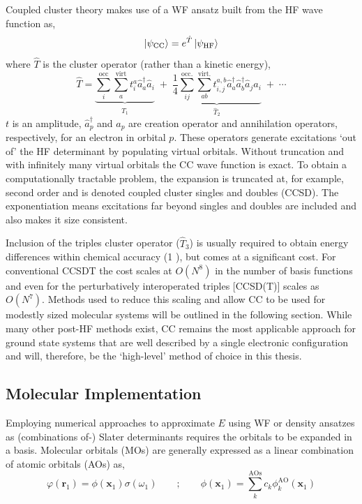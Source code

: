 \documentclass[main.tex]{subfiles}
\begin{document}
Coupled cluster theory makes use of a WF ansatz built from the HF wave function as,
\begin{equation}
\ket{\psi_\text{CC}} = {e}^{\hat{T}}\ket{\psi_\text{HF}}
\end{equation}
where $\hat{T}$ is the cluster operator (rather than a kinetic energy),
\begin{equation}
\hat{T} = \underbrace{\sum_i^\text{occ}\sum_a^\text{virt} t_i^a \hat{a}^\dagger_a\hat{a}_i }_{\hat{T}_1} \;+\; \underbrace{\frac{1}{4}\sum_{ij}^\text{occ.}\sum_{ab}^\text{virt.}t_{i, j}^{a, b} \hat{a}_a^\dagger\hat{a}_b^\dagger \hat{a}_j \hat{a}_i}_{\hat{T}_2} \;+ \;\cdots
\end{equation}
$t$ is an amplitude, $\hat{a}^\dagger_p$ and $\hat{a}_p$ are creation operator and annihilation operators, respectively, for an electron in orbital $p$. These operators  generate excitations `out of' the HF determinant by populating virtual orbitals. Without truncation and with infinitely many virtual orbitals the CC wave function is exact. To obtain a computationally tractable problem, the expansion is truncated at, for example, second order and is denoted coupled cluster singles and doubles (CCSD). The exponentiation means excitations far beyond singles and doubles are included and also makes it size consistent. 


Inclusion of the triples cluster operator ($\hat{T}_3$) is usually required to obtain energy differences within chemical accuracy (1 \kcal),\cite{Deustua2021} but comes at a significant cost. For conventional CCSDT the cost scales at $O(N^8)$ in the number of basis functions and even for the perturbatively interoperated triples [CCSD(T)] scales as $O(N^7)$. Methods used to reduce this scaling and allow CC to be used for modestly sized molecular systems will be outlined in the following section. While many other post-HF methods exist,\cite{SzaboOstlund} CC remains the most applicable approach for ground state systems that are well described by a single electronic configuration and will, therefore, be the `high-level' method of choice in this thesis.  


\subsection{Molecular Implementation}

Employing numerical approaches to approximate $E$ using WF or density ansatzes as (combinations of-) Slater determinants requires the orbitals to be expanded in a basis. Molecular orbitals (MOs) are generally expressed as a linear combination of atomic orbitals (AOs) as,
\begin{equation}
	\varphi(\boldsymbol{r}_1) = \phi(\boldsymbol{x}_1)\sigma(\omega_1) \qquad ; \qquad \phi(\boldsymbol{x}_1) = \sum_{k}^\text{AOs} c_k\phi_k^\text{AO}(\boldsymbol{x}_1)
\end{equation}
\end{document}
